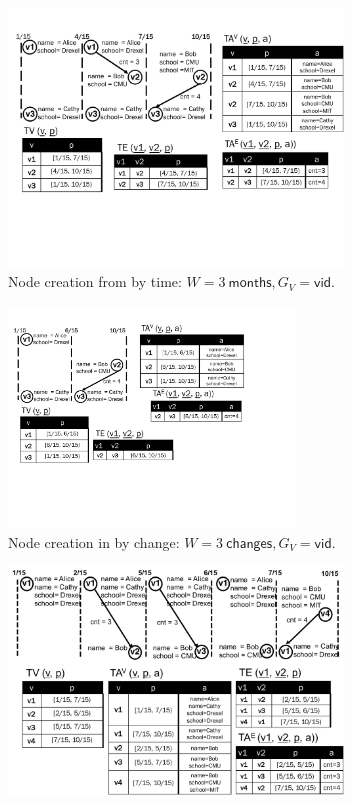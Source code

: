 \begin{figure}[t]
\begin{subfigure}[b]{0.5\textwidth}
\includegraphics[width=3.5in]{figs/agg1.pdf}
\caption{Node creation from  by time:
  $W=3~\textsf{months}, G_V=\textsf{vid}$.}
\label{fig:tg_agg1}
\end{subfigure}
\begin{subfigure}[b]{0.4\textwidth}
\includegraphics[width=3in]{figs/agg2.pdf}
\caption{Node creation in  by change:
  $W=3~\textsf{changes}, G_V=\textsf{vid}$.}
\label{fig:tg_agg2}
\end{subfigure}
\begin{subfigure}[b]{0.5\textwidth}
\includegraphics[width=3.5in]{figs/agg3.pdf}

\end{subfigure}
\end{figure}
